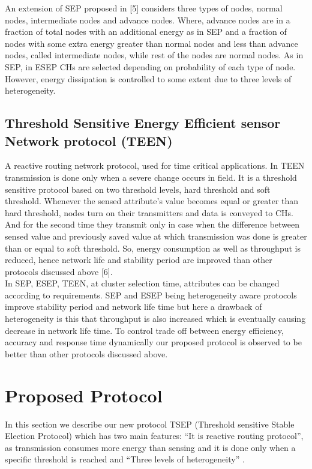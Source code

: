 \documentclass[conference]{IEEEtran}
\begin{document}
An extension of SEP proposed in [5] considers three types of nodes, normal nodes, intermediate nodes and advance nodes. Where, advance nodes are in a fraction of total nodes with an additional energy as in SEP and a fraction of nodes with some extra energy greater than normal nodes and less than advance nodes, called intermediate nodes, while rest of the nodes are normal nodes. As in SEP, in ESEP CHs are selected depending on probability of each type of node. However, energy dissipation is controlled to some extent due to three levels of heterogeneity.

\subsection{Threshold Sensitive Energy Efficient sensor Network protocol (TEEN)}

A reactive routing network protocol, used for time critical applications. In TEEN transmission is done only when a severe change occurs in field. It is a threshold sensitive protocol based on two threshold levels, hard threshold and soft threshold. Whenever the sensed attribute's value becomes equal or greater than hard threshold, nodes turn on their transmitters and data is conveyed to CHs. And for the second time they transmit only in case when the difference between sensed value and previously saved value at which transmission was done is greater than or equal to soft threshold. So, energy consumption as well as throughput is reduced, hence network life and stability period are improved than other protocols discussed above [6].\\

In SEP, ESEP, TEEN, at cluster selection time, attributes can be changed according to requirements. SEP and ESEP being heterogeneity aware protocols improve stability period and network life time but here a drawback of heterogeneity is this that throughput is also increased which is eventually causing decrease in network life time. To control trade off between energy efficiency, accuracy and response time dynamically our proposed protocol is observed to be better than other protocols discussed above.

\section{Proposed Protocol}
In this section we describe our new protocol TSEP (Threshold sensitive Stable Election Protocol) which has two main features: ``It is reactive routing protocol'', as transmission consumes more energy than sensing and it is done only when a specific threshold is reached and ``Three levels of heterogeneity'' .
\end{document}

